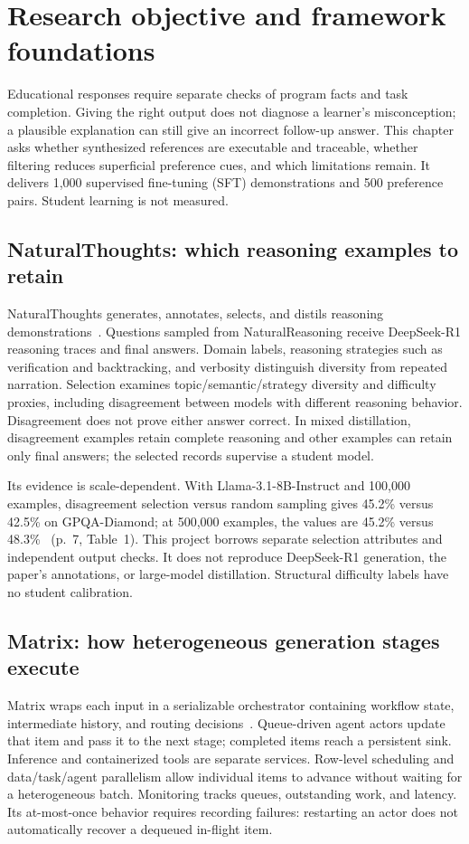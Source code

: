 \section{Research objective and framework foundations}
Educational responses require separate checks of program facts and task completion. Giving the right output does not diagnose a learner's misconception; a plausible explanation can still give an incorrect follow-up answer. This chapter asks whether synthesized references are executable and traceable, whether filtering reduces superficial preference cues, and which limitations remain. It delivers 1,000 supervised fine-tuning (SFT) demonstrations and 500 preference pairs. Student learning is not measured.

\subsection{NaturalThoughts: which reasoning examples to retain}
NaturalThoughts generates, annotates, selects, and distils reasoning demonstrations~\cite{nat}. Questions sampled from NaturalReasoning receive DeepSeek-R1 reasoning traces and final answers. Domain labels, reasoning strategies such as verification and backtracking, and verbosity distinguish diversity from repeated narration. Selection examines topic/semantic/strategy diversity and difficulty proxies, including disagreement between models with different reasoning behavior. Disagreement does not prove either answer correct. In mixed distillation, disagreement examples retain complete reasoning and other examples can retain only final answers; the selected records supervise a student model.

Its evidence is scale-dependent. With Llama-3.1-8B-Instruct and 100,000 examples, disagreement selection versus random sampling gives 45.2\% versus 42.5\% on GPQA-Diamond; at 500,000 examples, the values are 45.2\% versus 48.3\%~\cite{nat} (p.~7, Table~1). This project borrows separate selection attributes and independent output checks. It does not reproduce DeepSeek-R1 generation, the paper's annotations, or large-model distillation. Structural difficulty labels have no student calibration.

\subsection{Matrix: how heterogeneous generation stages execute}
Matrix wraps each input in a serializable orchestrator containing workflow state, intermediate history, and routing decisions~\cite{matrix}. Queue-driven agent actors update that item and pass it to the next stage; completed items reach a persistent sink. Inference and containerized tools are separate services. Row-level scheduling and data/task/agent parallelism allow individual items to advance without waiting for a heterogeneous batch. Monitoring tracks queues, outstanding work, and latency. Its at-most-once behavior requires recording failures: restarting an actor does not automatically recover a dequeued in-flight item.

